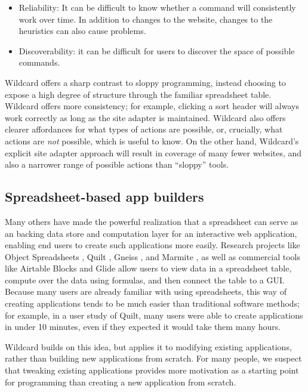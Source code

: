 \documentclass[english,submission]{programming}
\providecommand{\tightlist}{%
  \setlength{\itemsep}{0pt}\setlength{\parskip}{0pt}}
\begin{document}
\begin{itemize}
\tightlist
\item
  Reliability: It can be difficult to know whether a command will
  consistently work over time. In addition to changes to the website,
  changes to the heuristics can also cause problems.
\item
  Discoverability: it can be difficult for users to discover the space
  of possible commands.
\end{itemize}

Wildcard offers a sharp contrast to sloppy programming, instead choosing
to expose a high degree of structure through the familiar spreadsheet
table. Wildcard offers more consistency; for example, clicking a sort
header will always work correctly as long as the site adapter is
maintained. Wildcard also offers clearer affordances for what types of
actions are possible, or, crucially, what actions are \emph{not}
possible, which is useful to know. On the other hand, Wildcard's
explicit site adapter approach will result in coverage of many fewer
websites, and also a narrower range of possible actions than ``sloppy''
tools.

\hypertarget{spreadsheet-based-app-builders}{%
\subsection{Spreadsheet-based app
builders}\label{spreadsheet-based-app-builders}}

Many others have made the powerful realization that a spreadsheet can
serve as an backing data store and computation layer for an interactive
web application, enabling end users to create such applications more
easily. Research projects like Object Spreadsheets
\autocite{mccutchen2016}, Quilt \autocite{benson2014}, Gneiss
\autocite{chang2014}, and Marmite \autocite{wong2007}, as well as
commercial tools like Airtable Blocks \autocite{zotero-79} and Glide
\autocite{zotero-81} allow users to view data in a spreadsheet table,
compute over the data using formulas, and then connect the table to a
GUI. Because many users are already familiar with using spreadsheets,
this way of creating applications tends to be much easier than
traditional software methods; for example, in a user study of Quilt,
many users were able to create applications in under 10 minutes, even if
they expected it would take them many hours.

Wildcard builds on this idea, but applies it to modifying existing
applications, rather than building new applications from scratch. For
many people, we suspect that tweaking existing applications provides
more motivation as a starting point for programming than creating a new
application from scratch.
\end{document}
